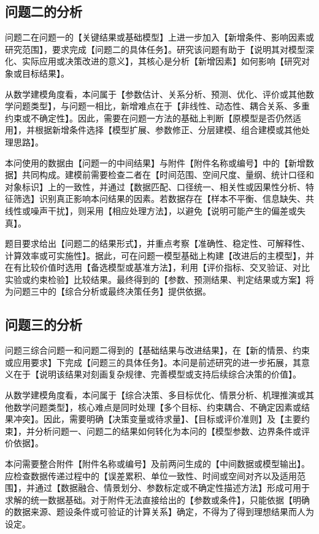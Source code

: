 \subsection{问题二的分析}

问题二在问题一的【关键结果或基础模型】上进一步加入【新增条件、影响因素或研究范围】，要求完成【问题二的具体任务】。研究该问题有助于【说明其对模型深化、实际应用或决策改进的意义】，其核心是分析【新增因素】如何影响【研究对象或目标结果】。

从数学建模角度看，本问属于【参数估计、关系分析、预测、优化、评价或其他数学问题类型】，与问题一相比，新增难点在于【非线性、动态性、耦合关系、多重约束或不确定性】。因此，需要在问题一方法的基础上判断【原模型是否仍然适用】，并根据新增条件选择【模型扩展、参数修正、分层建模、组合建模或其他处理思路】。

本问使用的数据由【问题一的中间结果】与附件【附件名称或编号】中的【新增数据】共同构成。建模前需要检查二者在【时间范围、空间尺度、量纲、统计口径和对象标识】上的一致性，并通过【数据匹配、口径统一、相关性或因果性分析、特征筛选】识别真正影响本问结果的因素。若数据存在【样本不平衡、信息缺失、共线性或噪声干扰】，则采用【相应处理方法】，以避免【说明可能产生的偏差或失真】。

题目要求给出【问题二的结果形式】，并重点考察【准确性、稳定性、可解释性、计算效率或可实施性】。据此，可在问题一模型基础上构建【改进后的主模型】，并在有比较价值时选用【备选模型或基准方法】，利用【评价指标、交叉验证、对比实验或约束检验】比较结果。最终得到的【参数、预测结果、判定结果或方案】将为问题三中的【综合分析或最终决策任务】提供依据。

\subsection{问题三的分析}

问题三综合问题一和问题二得到的【基础结果与改进结果】，在【新的情景、约束或应用要求】下完成【问题三的具体任务】。本问是前述研究的进一步拓展，其意义在于【说明该结果对刻画复杂规律、完善模型或支持后续综合决策的价值】。

从数学建模角度看，本问属于【综合决策、多目标优化、情景分析、机理推演或其他数学问题类型】，核心难点是同时处理【多个目标、约束耦合、不确定因素或结果冲突】。因此，需要明确【决策变量或待求量】、【目标或评价准则】及【主要约束】，并分析问题一、问题二的结果如何转化为本问的【模型参数、边界条件或评价依据】。

本问需要整合附件【附件名称或编号】及前两问生成的【中间数据或模型输出】。应检查数据传递过程中的【误差累积、单位一致性、时间或空间对齐以及适用范围】，并通过【数据融合、情景划分、参数标定或不确定性描述方法】形成可用于求解的统一数据基础。对于附件无法直接给出的【参数或条件】，只能依据【明确的数据来源、题设条件或可验证的计算关系】确定，不得为了得到理想结果而人为设定。


